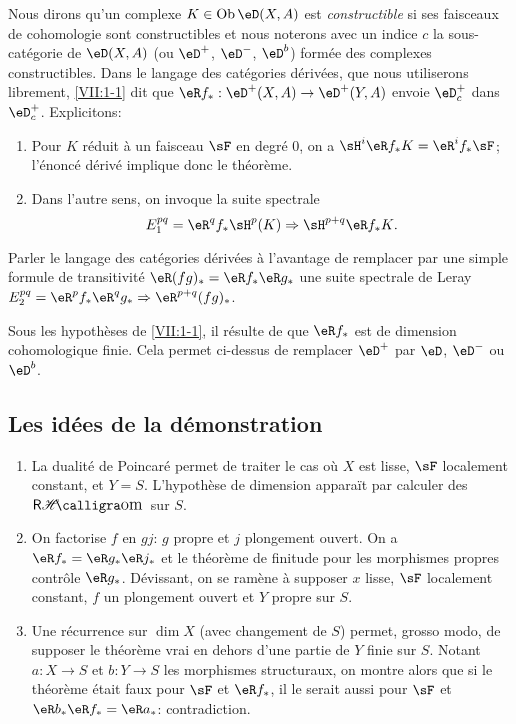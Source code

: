 Nous dirons qu'un complexe $K\in\ob\eD(X,A)$ est \emph{constructible} si ses 
faisceaux de cohomologie sont constructibles et nous noterons avec un indice 
$c$ la sous-cat\'egorie de $\eD(X,A)$ (ou $\eD^+$, $\eD^-$, $\eD^b$) form\'ee 
des complexes constructibles. Dans le langage des cat\'egories d\'eriv\'ees, 
que nous utiliserons librement, \ref{VII:1-1} dit que 
$\eR f_\ast:\eD^+(X,A) \to \eD^+(Y,A)$ envoie $\eD_c^+$ dans $\eD_c^+$. 
Explicitons: 
\begin{enumerate}[\indent a)]
  \item Pour $K$ r\'eduit \`a un faisceau $\sF$ en degr\'e $0$, on a 
    $\sH^i\eR f_\ast K = \eR^i f_\ast \sF$; l'\'enonc\'e d\'eriv\'e implique 
    donc le th\'eor\`eme. 
  \item Dans l'autre sens, on invoque la suite spectrale 
    \[
      E_1^{p q} = \eR^q f_\ast \sH^p(K) \Rightarrow \sH^{p+q} \eR f_\ast K \text{.} 
    \]
\end{enumerate}

Parler le langage des cat\'egories d\'eriv\'ees \`a l'avantage de remplacer par 
une simple formule de transitivit\'e $\eR(f g)_\ast = \eR f_\ast \eR g_\ast$ 
une suite spectrale de Leray 
$E_2^{p q} = \eR^p f_\ast \eR^q g_\ast \Rightarrow \eR^{p+q} (f g)_\ast$. 

Sous les hypoth\`eses de \ref{VII:1-1}, il r\'esulte de \cite{sga4} que 
$\eR f_\ast$ est de dimension cohomologique finie. Cela permet ci-dessus de 
remplacer $\eD^+$ par $\eD$, $\eD^-$ ou $\eD^b$. 





\subsection{Les id\'ees de la d\'emonstration}\label{VII:1-4}
\begin{enumerate}[\indent a)]
  \item La dualit\'e de Poincar\'e permet de traiter le cas o\`u $X$ est 
    lisse, $\sF$ localement constant, et $Y=S$. L'hypoth\`ese de dimension 
    appara\"it par calculer des $\rHom$ sur $S$.
  \item On factorise $f$ en $g j$: $g$ propre et $j$ plongement ouvert. On a 
    $\eR f_\ast = \eR g_\ast \eR j_\ast$ et le th\'eor\`eme de finitude pour 
    les morphismes propres contr\^ole $\eR g_\ast$. D\'evissant, on se ram\`ene 
    \`a supposer $x$ lisse, $\sF$ localement constant, $f$ un plongement ouvert 
    et $Y$ propre sur $S$. 
  \item Une r\'ecurrence sur $\dim X$ (avec changement de $S$) permet, grosso 
    modo, de supposer le th\'eor\`eme vrai en dehors d'une partie de $Y$ finie 
    sur $S$. Notant $a:X\to S$ et $b:Y\to S$ les morphismes structuraux, on 
    montre alors que si le th\'eor\`eme \'etait faux pour $\sF$ et 
    $\eR f_\ast$, il le serait aussi pour $\sF$ et 
    $\eR b_\ast \eR f_\ast = \eR a_\ast$: contradiction. 
\end{enumerate}





